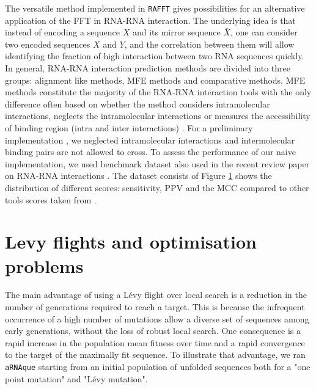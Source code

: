 The versatile method implemented in \texttt{RAFFT} gives possibilities for an alternative application of the FFT in RNA-RNA interaction. The underlying idea is that instead of encoding a sequence $X$ and its mirror sequence $\bar{X}$, one can consider two encoded sequences $X$ and $Y$, and the correlation between them will allow identifying the fraction of high interaction between two RNA sequences quickly. In general, RNA-RNA interaction prediction methods are divided into three groups: alignment like methods, MFE methods and comparative methods. MFE methods constitute the majority of the RNA-RNA interaction tools with the only difference often based on whether the method considers intramolecular interactions, neglects the intramolecular interactions or measures the accessibility of binding region (intra and inter interactions) \cite{umu2017comprehensive, dieterich2013computational, backofen2010computational}. For a preliminary implementation , we neglected intramolecular interactions and intermolecular binding pairs are not allowed to cross. To assess the performance of our naive implementation, we used benchmark dataset also used in the recent review paper on RNA-RNA interactions \cite{umu2017comprehensive}. The dataset consists of   Figure \ref{} shows the  distribution of  different scores: sensitivity, PPV and the MCC compared to other tools scores taken from  \cite{umu2017comprehensive}.

\section{Levy flights and optimisation problems}
The main advantage of using a Lévy flight over local search is a reduction in the number of generations required to reach a target. This is because the infrequent occurrence of a high number of mutations allow a diverse set of sequences among early generations, without the loss of robust local search. One consequence is a rapid increase in the population mean fitness over time and a rapid convergence to the target of the maximally fit sequence. To illustrate that advantage, we ran \texttt{aRNAque} starting from an initial population of unfolded sequences both for a "one point mutation" and "Lévy mutation".

